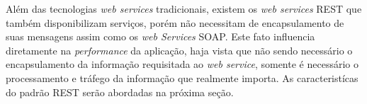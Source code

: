 	\par Além das tecnologias \textit{web services} tradicionais, existem os
\textit{web services} REST que também disponibilizam serviços, porém não
necessitam de encapsulamento de suas mensagens assim como os \textit{web
Services} SOAP. Este fato influencia diretamente na \textit{performance} da
aplicação, haja vista que não sendo necessário o encapsulamento da informação
requisitada ao \textit{web service}, somente é necessário o processamento e
tráfego da informação que realmente importa. As caracteristícas do padrão REST
serão abordadas na próxima seção.